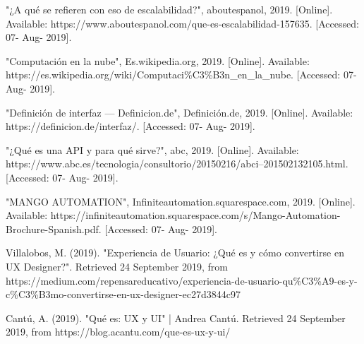 \begin{thebibliography}{10}
	"¿A qué se refieren con eso de escalabilidad?", aboutespanol, 2019. [Online]. Available: https://www.aboutespanol.com/que-es-escalabilidad-157635. [Accessed: 07- Aug- 2019].
	
	"Computación en la nube", Es.wikipedia.org, 2019. [Online]. Available: https://es.wikipedia.org/wiki/Computaci\%C3\%B3n\_en\_la\_nube. [Accessed: 07- Aug- 2019].
	
	 "Definición de interfaz — Definicion.de", Definición.de, 2019. [Online]. Available: https://definicion.de/interfaz/. [Accessed: 07- Aug- 2019].
	
	 "¿Qué es una API y para qué sirve?", abc, 2019. [Online]. Available: https://www.abc.es/tecnologia/consultorio/20150216/abci--201502132105.html. [Accessed: 07- Aug- 2019].
	
	 "MANGO AUTOMATION", Infiniteautomation.squarespace.com, 2019. [Online]. Available: https://infiniteautomation.squarespace.com/s/Mango-Automation-Brochure-Spanish.pdf. [Accessed: 07- Aug- 2019].
	
	 Villalobos, M. (2019). "Experiencia de Usuario: ¿Qué es y cómo convertirse en UX Designer?". Retrieved 24 September 2019, from https://medium.com/repensareducativo/experiencia-de-usuario-qu\%C3\%A9-es-y-c\%C3\%B3mo-convertirse-en-ux-designer-ec27d3844c97

	 Cantú, A. (2019). "Qué es: UX y UI" | Andrea Cantú. Retrieved 24 September 2019, from https://blog.acantu.com/que-es-ux-y-ui/
\end{thebibliography}
\newpage